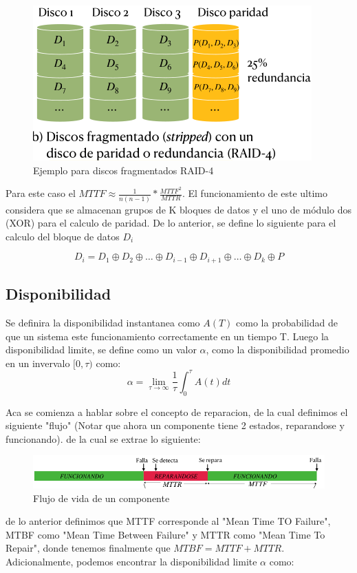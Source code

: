 \begin{figure}[H]
    \centering
    \includegraphics[width=1.0\linewidth]{img/Raid-4.png}
    \caption{Ejemplo para discos fragmentados RAID-4}\label{fig:1761834325234}
\end{figure}

Para este caso el $MTTF\approx\frac{1}{n(n-1)}*\frac{MTTF^2}{MTTR}$. El funcionamiento de este ultimo considera que se almacenan grupos de K bloques de datos y el uno de módulo dos (XOR) para el calculo de paridad. De lo anterior, se define lo siguiente para el calculo del bloque de datos $D_i$

\[
    D_i = D_1 \oplus D_2 \oplus \dots \oplus D_{i-1} \oplus D_{i+1} \oplus \dots \oplus D_k \oplus P
\]

\subsection{Disponibilidad}
Se definira la disponibilidad instantanea como $A(T)$ como la probabilidad de que un sistema este funcionamiento correctamente en un tiempo T. Luego la disponibilidad limite, se define como un valor $\alpha$, como la disponibilidad promedio en un invervalo $[0,\tau)$ como:
\[
    \alpha= \lim_{\tau \rightarrow \infty} \frac{1}{\tau}\int_{0}^{\tau}A(t)dt
\]

Aca se comienza a hablar sobre el concepto de reparacion, de la cual definimos el siguiente "flujo" (Notar que ahora un componente tiene 2 estados, reparandose y funcionando). de la cual se extrae lo siguiente:
\begin{figure}[H]
    \centering
    \includegraphics[width=1.0\linewidth]{img/MTTF.png}
    \caption{Flujo de vida de un componente}\label{fig:1761836148913}
\end{figure}
de lo anterior definimos que MTTF corresponde al "Mean Time TO Failure", MTBF como "Mean Time Between Failure" y MTTR como "Mean Time To Repair", donde tenemos finalmente que $MTBF= MTTF + MTTR$. Adicionalmente, podemos encontrar la disponibilidad limite $\alpha$ como:

